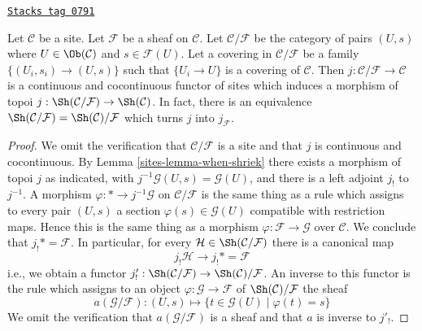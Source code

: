 \begin{lemma}
\label{sites-lemma-localize-topos-site}
\href{https://stacks.math.columbia.edu/tag/0791}{\texttt{Stacks tag 0791}}

Let $\mathcal{C}$ be a site. Let $\mathcal{F}$ be a sheaf on $\mathcal{C}$.
Let $\mathcal{C}/\mathcal{F}$ be the category of pairs $(U, s)$ where
$U \in \Ob(\mathcal{C})$ and $s \in \mathcal{F}(U)$. Let a covering in
$\mathcal{C}/\mathcal{F}$ be a family $\{(U_i, s_i) \to (U, s)\}$
such that $\{U_i \to U\}$ is a covering of $\mathcal{C}$.
Then $j : \mathcal{C}/\mathcal{F} \to \mathcal{C}$ is a continuous
and cocontinuous functor of sites which induces a morphism of topoi
$j : \Sh(\mathcal{C}/\mathcal{F}) \to \Sh(\mathcal{C})$. In fact, there
is an equivalence $\Sh(\mathcal{C}/\mathcal{F}) =
\Sh(\mathcal{C})/\mathcal{F}$ which turns $j$ into $j_\mathcal{F}$.
\end{lemma}

\begin{proof}

We omit the verification that $\mathcal{C}/\mathcal{F}$ is a site and
that $j$ is continuous and cocontinuous. By
Lemma \ref{sites-lemma-when-shriek} there exists a morphism of topoi
$j$ as indicated, with $j^{-1}\mathcal{G}(U, s) = \mathcal{G}(U)$,
and there is a left adjoint $j_!$ to $j^{-1}$. A morphism
$\varphi : * \to j^{-1}\mathcal{G}$ on $\mathcal{C}/\mathcal{F}$
is the same thing as a rule which assigns to every pair $(U, s)$ a
section $\varphi(s) \in \mathcal{G}(U)$ compatible with restriction maps.
Hence this is the same thing as a morphism
$\varphi : \mathcal{F} \to \mathcal{G}$ over $\mathcal{C}$.
We conclude that $j_!* = \mathcal{F}$. In particular, for every
$\mathcal{H} \in \Sh(\mathcal{C}/\mathcal{F})$ there is a canonical map
$$
j_!\mathcal{H} \to j_!* = \mathcal{F}
$$
i.e., we obtain a functor
$j'_! : \Sh(\mathcal{C}/\mathcal{F}) \to \Sh(\mathcal{C})/\mathcal{F}$.
An inverse to this functor is the rule which assigns to an object
$\varphi : \mathcal{G} \to \mathcal{F}$ of $\Sh(\mathcal{C})/\mathcal{F}$ the
sheaf
$$
a(\mathcal{G}/\mathcal{F}) :
(U, s) \longmapsto \{t \in \mathcal{G}(U) \mid \varphi(t) = s\}
$$
We omit the verification that $a(\mathcal{G}/\mathcal{F})$ is a sheaf
and that $a$ is inverse to $j'_!$.
\end{proof}

